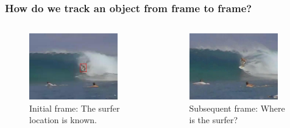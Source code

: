 %


\begin{frame}
    \frametitle{How do we track an object from frame to frame?}
    \begin{columns}[T]
        \begin{column}{0.5\textwidth}
            \begin{figure}
                \includegraphics[width=0.9\textwidth]{surfer_marked}
                \caption{Initial frame: The surfer location is known.}
            \end{figure}
        \end{column}
        \begin{column}{0.5\textwidth}
            \begin{figure}
                \includegraphics[width=0.9\textwidth]{surfer_unmarked}
                \caption{Subsequent frame: Where is the surfer?}
            \end{figure}
        \end{column}
    \end{columns}
\end{frame}


